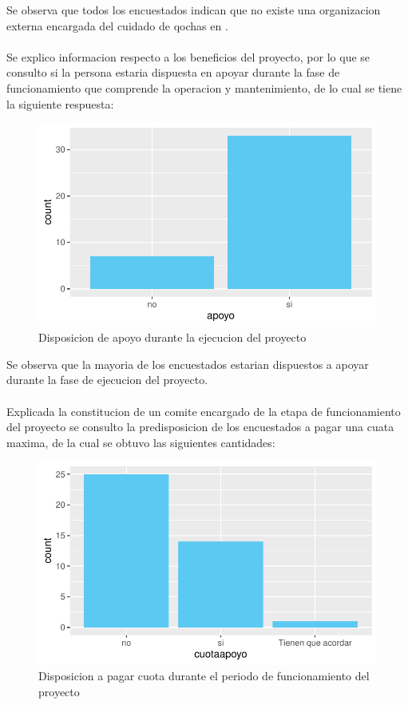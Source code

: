 \documentclass[12pt]{article}\usepackage[]{graphicx}\usepackage[]{xcolor}
\makeatletter
\def\maxwidth{ %
  \ifdim\Gin@nat@width>\linewidth
    \linewidth
  \else
    \Gin@nat@width
  \fi
}
\newenvironment{knitrout}{}{} %
\makeatother
\begin{document}
	Se observa que todos los encuestados indican que no existe una organizacion externa encargada del cuidado de qochas en \comunidad.\\
	\\
	Se explico informacion respecto a los beneficios del proyecto, por lo que se consulto si la persona estaria dispuesta en apoyar durante la fase de funcionamiento que comprende la operacion y mantenimiento, de lo cual se tiene la siguiente respuesta:
	\begin{figure}[H]
	\centering
\begin{knitrout}
\color{fgcolor}
\includegraphics[width=\maxwidth]{figure/veintisiete-1} 
\end{knitrout}
	\caption{Disposicion de apoyo durante la ejecucion del proyecto}
	\end{figure}
	Se observa que la mayoria de los encuestados estarian dispuestos a apoyar durante la fase de ejecucion del proyecto.\\
	\\
	Explicada la constitucion de un comite encargado de la etapa de funcionamiento del proyecto se consulto la predisposicion de los encuestados a pagar una cuata maxima, de la cual se obtuvo las siguientes cantidades:
	\begin{figure}[H]
	\centering
\begin{knitrout}
\color{fgcolor}
\includegraphics[width=\maxwidth]{figure/veintiocho-1} 
\end{knitrout}
	\caption{Disposicion a pagar cuota durante el periodo de funcionamiento del proyecto}
	\end{figure}
\end{document}
